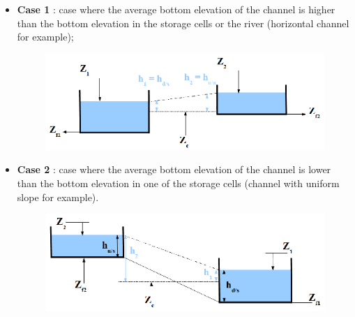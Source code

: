 \begin{itemize}
 \item \textbf{Case 1} : case where the average bottom elevation of the channel is higher than the bottom elevation in the storage cells or the river (horizontal channel for example);
   \begin{figure}[h]
    \begin{center}
     \includegraphics[scale=1.5]{Figures/Lchenal1.eps}
    \end{center}
   \end{figure}
   \vspace{0.5cm}
 \item \textbf{Case 2} : case where the average bottom elevation of the channel is lower than the bottom elevation in one of the storage cells (channel with uniform slope for example).
   \begin{figure}[h]
    \begin{center}
     \includegraphics[scale=1.5]{Figures/Lchenal2.eps}
    \end{center}
   \end{figure}
\end{itemize}

\vspace{0.5cm}

